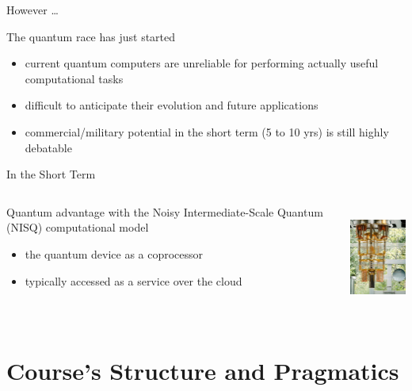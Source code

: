 \documentclass{beamer}
\begin{document}
\begin{frame}{However \dots}

        The quantum race has just started
        
        \begin{itemize}
                \item current quantum computers are \alert{unreliable}
                        for performing actually useful computational
                        tasks
                \item difficult to anticipate 
                        their  evolution and future applications
                \item commercial/military potential in the short term (5 to 10 yrs) 
                        is still highly debatable
        \end{itemize}
\end{frame}

\begin{frame}{In the Short Term}
  \begin{minipage}[0.3\textheight]{\textwidth}
  \begin{columns}[c]
  \begin{column}{0.7\textwidth}
        Quantum advantage with the \alert{Noisy Intermediate-Scale Quantum}
        (NISQ) computational model 
        \begin{itemize}
                \item the quantum device as a coprocessor
                \item typically accessed as a service over the cloud 
        \end{itemize}
  \end{column}
  \begin{column}{0.3\textwidth}
        \includegraphics[height=3.5cm]{./images/qc.jpg} 
  \end{column}
  \end{columns}
  \end{minipage}
\end{frame}

\section{Course's Structure and Pragmatics}
\end{document}
